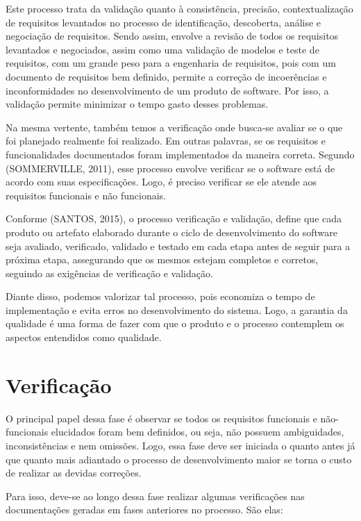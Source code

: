 \documentclass[runningheads]{llncs}
\begin{document}
Este processo trata da validação quanto à consistência, precisão, contextualização de requisitos levantados no processo de identificação, descoberta, análise e negociação de requisitos. Sendo assim, envolve a revisão de todos os requisitos levantados e negociados, assim como uma validação de modelos e teste de requisitos, com um grande peso para a engenharia de requisitos, pois com um documento de requisitos bem definido, permite a correção de incoerências e inconformidades no desenvolvimento de um produto de software. Por isso, a validação permite minimizar o tempo gasto desses problemas.

Na mesma vertente, também temos a verificação onde busca-se avaliar se o que foi planejado realmente foi realizado. Em outras palavras, se os requisitos e funcionalidades documentados foram implementados da maneira correta. Segundo (SOMMERVILLE, 2011)\cite{ref_book2}, esse processo envolve verificar se o software está de acordo com suas especificações. Logo, é preciso verificar se ele atende aos requisitos funcionais e não funcionais.

Conforme (SANTOS, 2015)\cite{ref_article2}, o processo verificação e validação, define que cada produto ou artefato elaborado durante o ciclo de desenvolvimento do software seja avaliado, verificado, validado e testado em cada etapa antes de seguir para a próxima etapa, assegurando que os mesmos estejam completos e corretos, seguindo as exigências de verificação e validação. 

Diante disso, podemos valorizar tal processo, pois economiza o tempo de implementação e evita erros no desenvolvimento do sistema. Logo, a garantia da qualidade é uma forma de fazer com que o produto e o processo contemplem os aspectos entendidos como qualidade.

\section{Verificação}
O principal papel dessa fase é observar se todos os requisitos funcionais e não-funcionais elucidados foram bem definidos, ou seja, não possuem ambiguidades, inconsistências e nem omissões. Logo, essa fase deve ser iniciada o quanto antes já que quanto mais adiantado o processo de desenvolvimento maior se torna o custo de realizar as devidas correções.

Para isso, deve-se ao longo dessa fase realizar algumas verificações nas documentações geradas em fases anteriores no processo. São elas:
\end{document}
